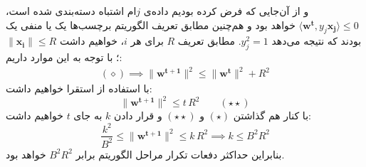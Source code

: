 \documentclass[a4paper, 12pt]{article}
\begin{document}
و از آن‌جایی که فرض کرده بودیم داده‌ی $j$ام اشتباه دسته‌بندی شده است،
$\langle\bm{w^{t}}, y_j\bm{x_j}\rangle \le 0$
خواهد بود و هم‌چنین مطابق تعریف الگوریتم برچسب‌ها یک یا منفی یک بودند که نتیجه می‌دهد $y_j^2 = 1$. مطابق تعریف $R$ برای هر $i$، خواهیم داشت
$\|\bm{x_i}\| \le R$
؛ با توجه به این موارد داریم:
\[
\begin{aligned}
	(\diamond) \implies \|\bm{w^{t+1}}\|^2 \le \|\bm{w^t}\|^2 + R^2 
\end{aligned}
\]
با استفاده از استقرا خواهیم داشت:
\[
\|\bm{w^{t+1}}\|^2 \le t\,R^2 \qquad (\star\star)
\]
با کنار هم گذاشتن
$(\star)$
و
$(\star\star)$
و قرار دادن $k$ به جای $t$ خواهیم داشت:
\[
\frac{k^2}{B^2} \le \|\bm{w^{t+1}}\|^2 \le k\,R^2 \implies \boxed{k \le B^2R^2}
\]
بنابراین حداکثر دفعات تکرار مراحل الگوریتم برابر $B^2R^2$ خواهد بود.

\pagebreak
\end{document}
